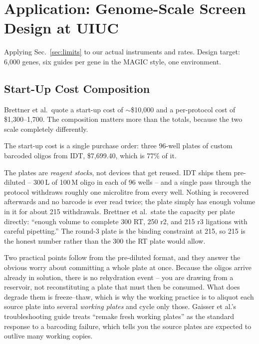 
\section{Application: Genome-Scale Screen Design at UIUC}
\label{sec:application}

Applying Sec.~\ref{sec:limits} to our actual instruments and rates. Design target:
6{,}000 genes, six guides per gene in the MAGIC style, one environment.

\subsection{Start-Up Cost Composition}
\label{sec:startup}

Brettner et al.\ quote a start-up cost of $\sim$\$10{,}000 and a per-protocol cost of
\$1{,}300--1{,}700. The composition matters more than the totals, because the two
scale completely differently.



The start-up cost is a single purchase order: three 96-well plates of custom
barcoded oligos from IDT, \$7{,}699.40, which is 77\% of it.

 The plates are \emph{reagent stocks},
not devices that get reused. IDT ships them pre-diluted -- 300\,\textmu L of
100\,\textmu M oligo in each of 96 wells -- and a single pass through the
protocol withdraws roughly one microlitre from every well. Nothing is recovered
afterwards and no barcode is ever read twice; the plate simply has enough volume
in it for about 215 withdrawals. Brettner et al.\ state the capacity per plate
directly: ``enough volume to complete 300 RT, 250 r2, and 215 r3 ligations with
careful pipetting.'' The round-3 plate is the binding constraint at 215, so 215
is the honest number rather than the 300 the RT plate would allow.

Two practical points follow from the pre-diluted format, and they answer the
obvious worry about committing a whole plate at once. Because the oligos arrive
already in solution, there is no rehydration event -- you are drawing from a
reservoir, not reconstituting a plate that must then be consumed. What does
degrade them is freeze--thaw, which is why the working practice is to aliquot
each source plate into several \emph{working plates} and cycle only those.
Gaisser et al.'s troubleshooting guide treats ``remake fresh working plates'' as
the standard response to a barcoding failure, which tells you the source plates
are expected to outlive many working copies.

